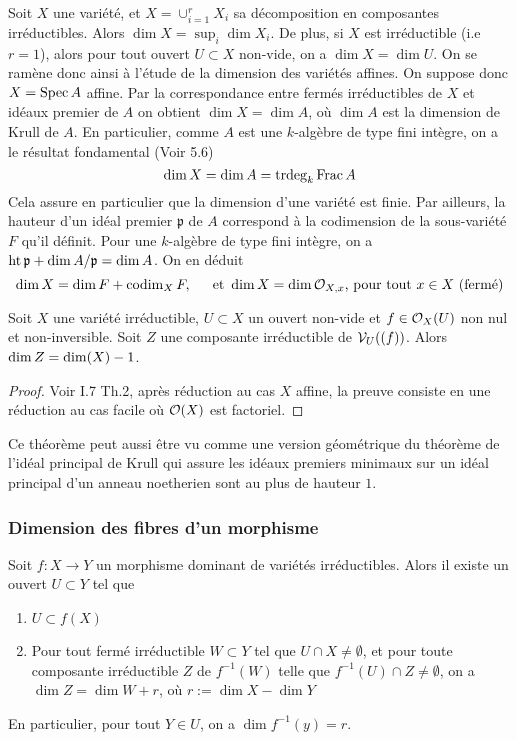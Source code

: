 Soit $X$ une variété, et $X=\cup_{i=1}^rX_i$ sa décomposition en composantes irréductibles. Alors $\dim X=\sup_i \dim X_i$. De plus, si $X$ est irréductible (i.e $r=1$), alors pour tout ouvert $U\subset X$ non-vide, on a $\dim X=\dim U$. On se ramène donc ainsi à l'étude de la dimension des variétés affines. On suppose donc $X=\operatorname{Spec} A$ affine. Par la correspondance entre fermés irréductibles de $X$ et idéaux premier de $A$ on obtient $\dim X= \dim A$, où $\dim A$ est la dimension de Krull de $A$. En particulier, comme $A$ est une $k$-algèbre de type fini intègre, on a le résultat fondamental (Voir \cite{Matsumura} 5.6)
$$\dim X=\dim A=\operatorname{trdeg}_k \operatorname{Frac} A$$
Cela assure en particulier que la dimension d'une variété est finie. Par ailleurs, la hauteur d'un idéal premier $\mathfrak{p}$ de $A$ correspond à la codimension de la sous-variété $F$ qu'il définit. Pour une $k$-algèbre de type fini intègre, on a $\operatorname{ht} \mathfrak{p}+ \dim A/\mathfrak{p}=\dim A$. On en déduit
$$\dim X=\dim F+\operatorname{codim}_X F,\,\,\,\,\,\,\, \text{ et } \dim X=\dim\mathcal{O}_{X,x} \text{, pour tout } x\in X \text{ (fermé)}$$

\begin{thm}\label{dimsousvariete}
Soit $X$ une variété irréductible, $U\subset X$ un ouvert non-vide et $f\in \mathcal{O}_X(U)$ non nul et non-inversible. Soit $Z$ une composante irréductible de $\mathcal{V}_U((f))$. Alors $\operatorname{dim} Z= \operatorname{dim}(X)-1$.
\end{thm}
\begin{proof}
Voir \cite{MumfordRedBook} I.7 Th.2, après réduction au cas $X$ affine, la preuve consiste en une réduction au cas facile où $\mathcal{O}(X)$ est factoriel. 
\end{proof}

Ce théorème peut aussi être vu comme une version géométrique du théorème de l'idéal principal de Krull qui assure les idéaux premiers minimaux sur un idéal principal d'un anneau noetherien sont au plus de hauteur $1$.

\subsubsection{Dimension des fibres d'un morphisme}

\begin{thm}\label{dimensionfibres}
Soit $f:X\rightarrow Y$ un morphisme dominant de variétés irréductibles. Alors il existe un ouvert $U\subset Y$ tel que
\begin{enumerate}
\item $U\subset f(X)$
\item Pour tout fermé irréductible $W\subset Y$ tel que $U\cap X\neq \emptyset$, et pour toute composante irréductible $Z$ de $f^{-1}(W)$  telle que $f^{-1}(U)\cap Z\neq \emptyset$, on a $\dim Z=\dim W + r$, où $r:=\dim X -\dim Y$
\end{enumerate}
En particulier, pour tout $Y\in U$, on a $\dim f^{-1}(y)=r.$
\end{thm}

